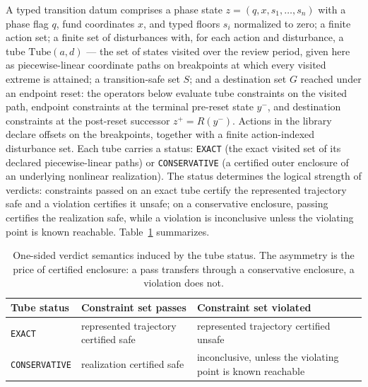 \documentclass[11pt]{article}
\begin{document}
A typed transition datum comprises a phase state
$z = (q, x, s_1, \dots, s_n)$ with a phase flag $q$, fund coordinates $x$,
and typed floors $s_i$ normalized to zero; a finite action set; a finite set of disturbances with, for each action
and disturbance, a tube $\mathrm{Tube}(a, d)$ --- the set of states
visited over the review period, given here as piecewise-linear coordinate
paths on breakpoints at which every visited extreme is attained; a
transition-safe set $S$; and a destination set $G$ reached under an
endpoint reset: the operators below evaluate tube constraints on the
visited path, endpoint constraints at the terminal pre-reset state
$y^{-}$, and destination constraints at the post-reset successor
$z^{+} = R(y^{-})$. Actions in the library declare offsets on the
breakpoints, together with a finite action-indexed disturbance set. Each
tube carries a status: \texttt{EXACT} (the exact visited set of its
declared piecewise-linear paths) or \texttt{CONSERVATIVE} (a certified
outer enclosure of an underlying nonlinear realization). The status
determines the logical strength of verdicts: constraints passed on an
exact tube certify the represented trajectory safe and a violation
certifies it unsafe; on a conservative enclosure, passing certifies the
realization safe, while a violation is inconclusive unless the violating
point is known reachable. Table~\ref{tab:verdicts} summarizes.

\begin{table}[t]
\centering\small
\begin{tabular}{@{}lll@{}}
\toprule
Tube status & Constraint set passes & Constraint set violated \\
\midrule
\texttt{EXACT} & represented trajectory certified safe & represented
trajectory certified unsafe \\
\texttt{CONSERVATIVE} & realization certified safe & inconclusive,
unless the violating point is known reachable \\
\bottomrule
\end{tabular}
\caption{One-sided verdict semantics induced by the tube status. The
asymmetry is the price of certified enclosure: a pass transfers through
a conservative enclosure, a violation does not.}
\label{tab:verdicts}
\end{table}
\end{document}
